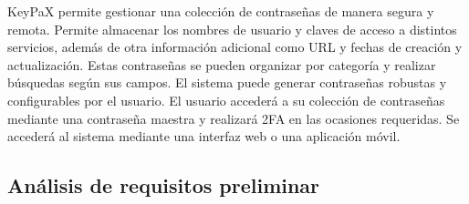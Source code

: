 \documentclass{article}
\begin{document}
KeyPaX permite gestionar una colección de contraseñas de manera segura y remota. Permite almacenar los nombres de usuario y claves de acceso a distintos servicios, además de otra información adicional como URL y fechas de creación y actualización. Estas contraseñas se pueden organizar por categoría y realizar búsquedas según sus campos. El sistema puede generar contraseñas robustas y configurables por el usuario. El usuario accederá a su colección de contraseñas mediante una contraseña maestra y realizará 2FA en las ocasiones requeridas. Se accederá al sistema mediante una interfaz web o una aplicación móvil.

\subsection{Análisis de requisitos preliminar}
\end{document}
